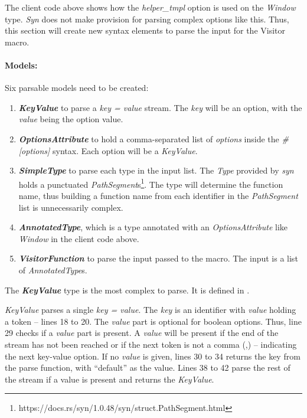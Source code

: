 The client code above shows how the \textit{helper\_tmpl} option is used on the \textit{Window} type.
\textit{Syn} does not make provision for parsing complex options like this.
Thus, this section will create new syntax elements to parse the input for the Visitor macro.

\paragraph{Models:}
Six parsable models need to be created:
\begin{enumerate}
	\item \textbf{\textit{KeyValue}} to parse a \textit{key = value} stream.
	      The \textit{key} will be an option, with the \textit{value} being the option value.
	\item \textbf{\textit{OptionsAttribute}} to hold a comma-separated list of \textit{options} inside the \textit{\#[options]} syntax.
	      Each option will be a \textit{KeyValue}.
	\item \textbf{\textit{SimpleType}} to parse each type in the input list.
	      The \textit{Type} provided by \textit{syn} holds a punctuated \textit{PathSegment}s\footnote{https://docs.rs/syn/1.0.48/syn/struct.PathSegment.html}.
	      The type will determine the function name, thus building a function name from each identifier in the \textit{PathSegment} list is unnecessarily complex.
	\item \textbf{\textit{AnnotatedType}}, which is a type annotated with an \textit{OptionsAttribute} like \textit{Window} in the client code above.
	\item \textbf{\textit{VisitorFunction}} to parse the input passed to the macro.
	      The input is a list of \textit{AnnotatedType}s.
\end{enumerate}

The \textbf{\textit{KeyValue}} type is the most complex to parse.
It is defined in .

\textit{KeyValue} parses a single \textit{key = value}.
The \textit{key} is an identifier with \textit{value} holding a token -- lines 18 to 20.
The \textit{value} part is optional for boolean options.
Thus, line 29 checks if a \textit{value} part is present.
A \textit{value} will be present if the end of the stream has not been reached or if the next token is not a comma (,) -- indicating the next key-value option.
If no \textit{value} is given, lines 30 to 34 returns the key from the parse function, with ``default'' as the value.
Lines 38 to 42 parse the rest of the stream if a value is present and returns the \textit{KeyValue}.

